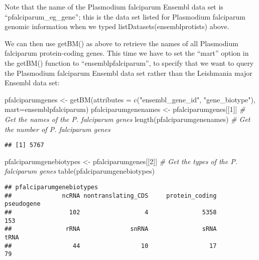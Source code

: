 \documentclass[
]{book}
\newenvironment{Shaded}{\begin{snugshade}}{\end{snugshade}}
\newcommand{\AttributeTok}[1]{\textcolor[rgb]{0.77,0.63,0.00}{#1}}
\newcommand{\CommentTok}[1]{\textcolor[rgb]{0.56,0.35,0.01}{\textit{#1}}}
\newcommand{\DecValTok}[1]{\textcolor[rgb]{0.00,0.00,0.81}{#1}}
\newcommand{\FunctionTok}[1]{\textcolor[rgb]{0.00,0.00,0.00}{#1}}
\newcommand{\NormalTok}[1]{#1}
\newcommand{\OtherTok}[1]{\textcolor[rgb]{0.56,0.35,0.01}{#1}}
\newcommand{\StringTok}[1]{\textcolor[rgb]{0.31,0.60,0.02}{#1}}
\begin{document}
Note that the name of the Plasmodium falciparum Ensembl data set is ``pfalciparum\_eg\_gene''; this is the data set listed for Plasmodium falciparum genomic information when we typed listDatasets(ensemblprotists) above.

We can then use getBM() as above to retrieve the names of all Plasmodium falciparum protein-coding genes. This time we have to set the ``mart'' option in the getBM() function to ``ensemblpfalciparum'', to specify that we want to query the Plasmodium falciparum Ensembl data set rather than the Leishmania major Ensembl data set:

\begin{Shaded}
\begin{Highlighting}[]
\NormalTok{pfalciparumgenes }\OtherTok{\textless{}{-}} \FunctionTok{getBM}\NormalTok{(}\AttributeTok{attributes =} \FunctionTok{c}\NormalTok{(}\StringTok{"ensembl\_gene\_id"}\NormalTok{, }\StringTok{"gene\_biotype"}\NormalTok{), }\AttributeTok{mart=}\NormalTok{ensemblpfalciparum)}
\NormalTok{pfalciparumgenenames }\OtherTok{\textless{}{-}}\NormalTok{ pfalciparumgenes[[}\DecValTok{1}\NormalTok{]] }\CommentTok{\# Get the names of the P. falciparum genes}
\FunctionTok{length}\NormalTok{(pfalciparumgenenames)                  }\CommentTok{\# Get the number of P. falciparum genes}
\end{Highlighting}
\end{Shaded}

\begin{verbatim}
## [1] 5767
\end{verbatim}

\begin{Shaded}
\begin{Highlighting}[]
\NormalTok{pfalciparumgenebiotypes }\OtherTok{\textless{}{-}}\NormalTok{ pfalciparumgenes[[}\DecValTok{2}\NormalTok{]] }\CommentTok{\# Get the types of the P. falciparum genes}
\FunctionTok{table}\NormalTok{(pfalciparumgenebiotypes)}
\end{Highlighting}
\end{Shaded}

\begin{verbatim}
## pfalciparumgenebiotypes
##              ncRNA nontranslating_CDS     protein_coding         pseudogene 
##                102                  4               5358                153 
##               rRNA              snRNA               sRNA               tRNA 
##                 44                 10                 17                 79
\end{verbatim}
\end{document}
